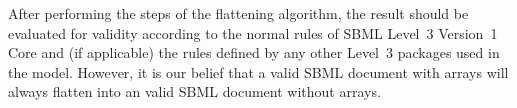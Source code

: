 After performing the steps of the flattening algorithm, the result should be evaluated for validity according to the normal rules of SBML Level~3 Version~1 Core and (if applicable) the rules defined by any other Level~3 packages used in the model.  However, it is our belief that a valid SBML document with arrays will always flatten into an valid SBML document without arrays.


%
%
%
%
%
%
%
%
%    
%       
%
%
